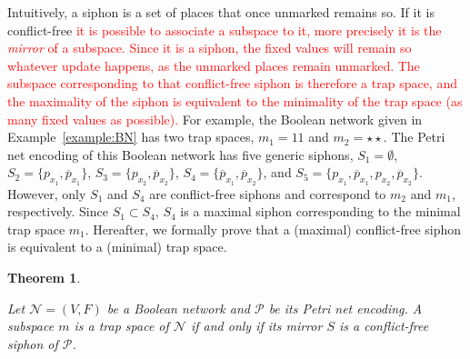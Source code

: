 \documentclass[preprint,12pt]{elsarticle}
\newtheorem{theorem}{Theorem}[section]
\newcommand{\change}[1]{\textcolor{red}{#1}}
\begin{document}
Intuitively, a siphon is a set of places that once unmarked remains so.
If it is conflict-free \change{it is possible to associate a subspace to it, more precisely it is the \emph{mirror} of a subspace.
Since it is a siphon, the fixed values will remain so whatever update happens, as the unmarked places remain unmarked.
The subspace corresponding to that conflict-free siphon is therefore a trap space, and the maximality of the siphon is equivalent to the minimality of the trap space (as many fixed values as possible).}
For example, the Boolean network given in Example~\ref{example:BN} has two trap spaces, \(m_1 = 11\) and \(m_2 = \star\star\).
The Petri net encoding of this Boolean network has five generic siphons, \(S_1 = \emptyset\), \(S_2 = \{p_{x_1}, \overline{p}_{x_1}\}\), \(S_3 = \{p_{x_2}, \overline{p}_{x_2}\}\), \(S_4 = \{\overline{p}_{x_1}, \overline{p}_{x_2}\}\), and \(S_5 = \{p_{x_1}, \overline{p}_{x_1}, p_{x_2}, \overline{p}_{x_2}\}\).
However, only \(S_1\) and \(S_4\) are conflict-free siphons and correspond to \(m_2\) and \(m_1\), respectively.
Since \(S_1 \subset S_4\), \(S_4\) is a maximal siphon corresponding to the minimal trap space \(m_1\).
Hereafter, we formally prove that a (maximal) conflict-free siphon is equivalent to a (minimal) trap space.

\begin{theorem}%
\label{theo:ts_2_sp}

  Let \(\mathcal{N} = (V, F)\) be a Boolean network and \(\mathcal{P}\) be its Petri net encoding. A subspace \(m\) is a trap space of \(\mathcal{N}\) if and only if its mirror \(S\) is a conflict-free siphon of \(\mathcal{P}\).

\end{theorem}
\end{document}
